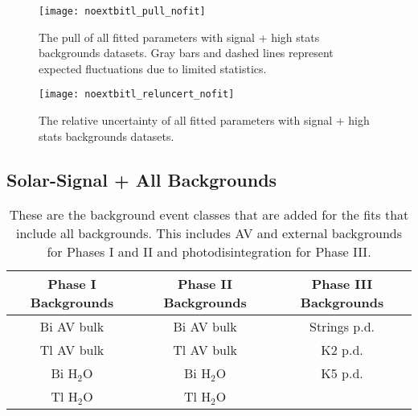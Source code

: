 \begin{figure}
\centering
\texttt{[image: noextbitl\_pull\_nofit]}
\caption{
The pull of all fitted parameters with signal + high stats backgrounds datasets. Gray bars and dashed lines represent expected fluctuations due to limited statistics.
}
\label{fig:noextbitl_pull}
\end{figure}

\begin{figure}
\centering
\texttt{[image: noextbitl\_reluncert\_nofit]}
\caption{
The relative uncertainty of all fitted parameters with signal + high stats backgrounds datasets.
}
\label{fig:noextbitl_reluncert}
\end{figure}

\clearpage

\subsection{Solar-Signal + All Backgrounds}
\label{3phase_allbg}

\begin{table}
\centering
\begin{tabular}{ccc}
\hline
Phase I Backgrounds & Phase II Backgrounds & Phase III Backgrounds\\ \hline \hline
Bi AV bulk & Bi AV bulk & Strings p.d. \\
Tl AV bulk & Tl AV bulk & K2 p.d. \\
Bi H$_2$O & Bi H$_2$O & K5 p.d. \\
Tl H$_2$O & Tl H$_2$O & \\ \hline
\end{tabular}
\caption{
These are the background event classes that are added for the fits that include all backgrounds. This includes AV and external backgrounds for Phases I and II and photodisintegration for Phase III.
}
\label{tbl:allbg_event_classes}
\end{table}

